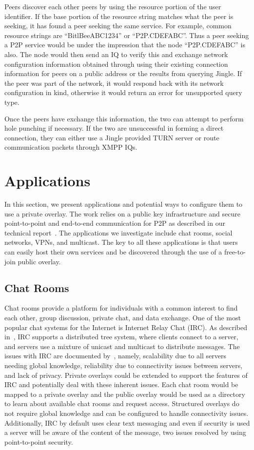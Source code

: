 \documentclass[conference]{IEEEtran}
\begin{document}
Peers discover each other peers by using the resource portion of the user
identifier.  If the base portion of the resource string matches what the peer
is seeking, it has found a peer seeking the same service.  For example, common
resource strings are ``BitlBeeABC1234'' or ``P2P.CDEFABC''.  Thus a peer
seeking a P2P service would be under the impression that the node
``P2P.CDEFABC'' is also.  The node would then send an IQ to verify this and
exchange network configuration information obtained through using their
existing connection information for peers on a public address or the results
from querying Jingle.  If the peer was part of the network, it would respond
back with its network configuration in kind, otherwise it would return an error
for unsupported query type.

Once the peers have exchange this information, the two can attempt to perform
hole punching if necessary.  If the two are unsuccessful in forming a direct
connection, they can either use a Jingle provided TURN server or route
communication packets through XMPP IQs.

\section{Applications}
\label{applications}

In this section, we present applications and potential ways to configure them
to use a private overlay.  The work relies on a public key infrastructure and
secure point-to-point and end-to-end communication for P2P as described in our
technical report~\cite{vpo}.  The applications we investigate include chat
rooms, social networks, VPNs, and multicast.  The key to all these applications
is that users can easily host their own services and be discovered through the
use of a free-to-join public overlay.

\subsection{Chat Rooms}

Chat rooms provide a platform for individuals with a common interest to find
each other, group discussion, private chat, and data exchange.  One of the most
popular chat systems for the Internet is Internet Relay Chat (IRC).  As
described in~\cite{irc}, IRC supports a distributed tree system, where clients
connect to a server, and servers use a mixture of unicast and multicast to
distribute messages.  The issues with IRC are documented by~\cite{irc_arch},
namely, scalability due to all servers needing global knowledge, reliability
due to connectivity issues between servers, and lack of privacy.  Private
overlays could be extended to support the features of IRC and potentially deal
with these inherent issues.  Each chat room would be mapped to a private
overlay and the public overlay would be used as a directory to learn about
available chat rooms and request access.  Structured overlays do not require
global knowledge and can be configured to handle connectivity issues.
Additionally, IRC by default uses clear text messaging and even if security is
used a server will be aware of the content of the message, two issues resolved
by using point-to-point security.
\end{document}
